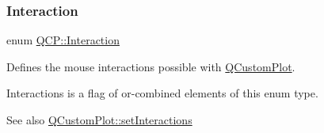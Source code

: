 \subsubsection{\texorpdfstring{Interaction}{Interaction}}
{\footnotesize\ttfamily enum \hyperlink{namespace_q_c_p_a2ad6bb6281c7c2d593d4277b44c2b037}{Q\+C\+P\+::\+Interaction}}

Defines the mouse interactions possible with \hyperlink{class_q_custom_plot}{Q\+Custom\+Plot}.

{\ttfamily Interactions} is a flag of or-\/combined elements of this enum type.

\begin{DoxySeeAlso}{See also}
\hyperlink{class_q_custom_plot_a5ee1e2f6ae27419deca53e75907c27e5}{Q\+Custom\+Plot\+::set\+Interactions} 
\end{DoxySeeAlso}
